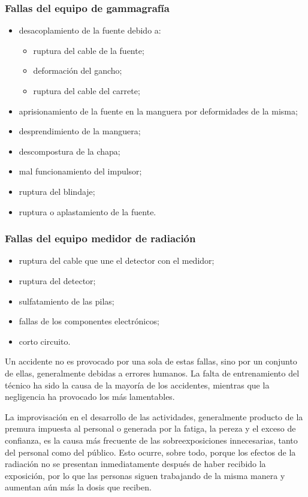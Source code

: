 \subsubsection{Fallas del equipo de gammagrafía}
\begin{itemize}
  \item desacoplamiento de la fuente debido a:
  \begin{itemize}
    \item ruptura del cable de la fuente;
    \item deformación del gancho;
    \item ruptura del cable del carrete;
  \end{itemize}
  \item aprisionamiento de la fuente en la manguera por deformidades de la misma;
  \item desprendimiento de la manguera;
  \item descompostura de la chapa;
  \item mal funcionamiento del impulsor;
  \item ruptura del blindaje;
  \item ruptura o aplastamiento de la fuente.
\end{itemize}

\subsubsection{Fallas del equipo medidor de radiación}
\begin{itemize}
  \item ruptura del cable que une el detector con el medidor;
  \item ruptura del detector;
  \item sulfatamiento de las pilas;
  \item fallas de los componentes electrónicos;
  \item corto circuito.
\end{itemize}

Un accidente no es provocado por una sola de estas fallas, sino por un conjunto de ellas, generalmente debidas a errores humanos. La falta de entrenamiento del técnico ha sido la causa de la mayoría de los accidentes, mientras que la negligencia ha provocado los más lamentables.

La improvisación en el desarrollo de las actividades, generalmente producto de la premura impuesta al personal o generada por la fatiga, la pereza y el exceso de confianza, es la causa más frecuente de las sobreexposiciones innecesarias, tanto del personal como del público. Esto ocurre, sobre todo, porque los efectos de la radiación no se presentan inmediatamente después de haber recibido la exposición, por lo que las personas siguen trabajando de la misma manera y aumentan aún más la dosis que reciben.

